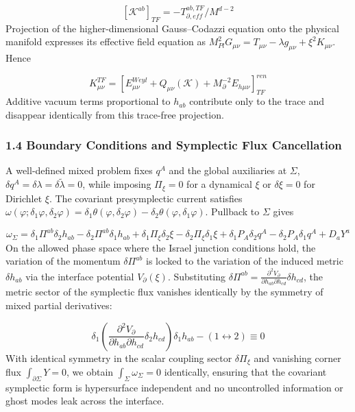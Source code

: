 \documentclass[aps,prd,onecolumn,superscriptaddress,nofootinbib,longbibliography,10pt]{revtex4-2}
\begin{document}
{{  \[ [\mathcal{K}^{ab}]_{TF} = -T^{ab,TF}_{\partial,eff} / M^{d-2} \]
  Projection of the higher-dimensional Gauss–Codazzi equation onto the physical manifold expresses its effective field equation as \(M_{Pl}^2 G_{\mu\nu} = T_{\mu\nu} - \lambda g_{\mu\nu} + \xi^2 K_{\mu\nu}\). Hence


  \[ K^{TF}_{\mu\nu} = \left[ E^{Weyl}_{\mu\nu} + Q_{\mu\nu}(\mathcal{K}) + M_\partial^{-2} E_{h\mu\nu} \right]^{ren}_{TF} \]
  Additive vacuum terms proportional to \(h_{ab}\) contribute only to the trace and disappear identically from this trace-free projection.



  
\subsubsection*{1.4 Boundary Conditions and Symplectic Flux Cancellation}

  A well-defined mixed problem fixes \(q^A\) and the global auxiliaries at \(\Sigma\), \(\delta q^A = \delta\lambda = \delta\tilde{\lambda} = 0\), while imposing \(\Pi_\xi = 0\) for a dynamical \(\xi\) or \(\delta\xi = 0\) for Dirichlet \(\xi\). The covariant presymplectic current satisfies \(\omega(\varphi; \delta_1\varphi, \delta_2\varphi) = \delta_1\theta(\varphi, \delta_2\varphi) - \delta_2\theta(\varphi, \delta_1\varphi)\). Pullback to \(\Sigma\) gives


  \[ \omega_\Sigma = \delta_1\Pi^{ab}\delta_2 h_{ab} - \delta_2\Pi^{ab}\delta_1 h_{ab} + \delta_1\Pi_\xi \delta_2\xi - \delta_2\Pi_\xi \delta_1\xi + \delta_1 P_A \delta_2 q^A - \delta_2 P_A \delta_1 q^A + D_a Y^a \]
  On the allowed phase space where the Israel junction conditions hold, the variation of the momentum \(\delta\Pi^{ab}\) is locked to the variation of the induced metric \(\delta h_{ab}\) via the interface potential \(V_\partial(\xi)\). Substituting \(\delta\Pi^{ab} = \frac{\partial^2 V_\partial}{\partial h_{ab}\partial h_{cd}}\delta h_{cd}\), the metric sector of the symplectic flux vanishes identically by the symmetry of mixed partial derivatives:


  \[ \delta_1\left( \frac{\partial^2 V_\partial}{\partial h_{ab}\partial h_{cd}}\delta_2 h_{cd} \right)\delta_1 h_{ab} - (1 \leftrightarrow 2) \equiv 0 \]
  With identical symmetry in the scalar coupling sector \(\delta\Pi_\xi\) and vanishing corner flux \(\int_{\partial\Sigma} Y = 0\), we obtain \(\int_\Sigma \omega_\Sigma = 0\) identically, ensuring that the covariant symplectic form is hypersurface independent and no uncontrolled information or ghost modes leak across the interface.



}}
\end{document}
